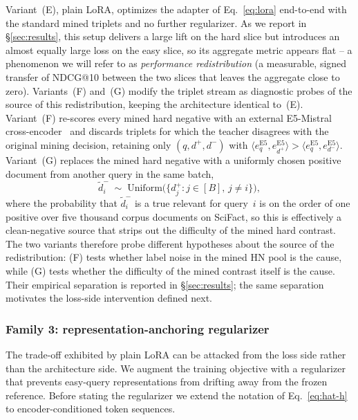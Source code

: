 Variant~(E), plain LoRA, optimizes the adapter of Eq.~\eqref{eq:lora} end-to-end with the standard mined triplets and no further regularizer. As we report in \S\ref{sec:results}, this setup delivers a large lift on the hard slice but introduces an almost equally large loss on the easy slice, so its aggregate metric appears flat -- a phenomenon we will refer to as \emph{performance redistribution} (a measurable, signed transfer of NDCG@10 between the two slices that leaves the aggregate close to zero). Variants~(F) and~(G) modify the triplet stream as diagnostic probes of the source of this redistribution, keeping the architecture identical to~(E).
Variant~(F) re-scores every mined hard negative with an external E5-Mistral cross-encoder~\cite{wang2024e5mistral} and discards triplets for which the teacher disagrees with the original mining decision, retaining only $(q, d^+, d^-)$ with $\langle e_q^{\text{E5}}, e_{d^+}^{\text{E5}}\rangle > \langle e_q^{\text{E5}}, e_{d^-}^{\text{E5}}\rangle$.
Variant~(G) replaces the mined hard negative with a uniformly chosen positive document from another query in the same batch,
\[
\tilde d_i^- \;\sim\; \mathrm{Uniform}\bigl(\{d_j^+ : j \in [B],\, j \neq i\}\bigr),
\]
where the probability that $\tilde d_i^-$ is a true relevant for query~$i$ is on the order of one positive over five thousand corpus documents on SciFact, so this is effectively a clean-negative source that strips out the difficulty of the mined hard contrast.
The two variants therefore probe different hypotheses about the source of the redistribution: (F) tests whether label noise in the mined HN pool is the cause, while (G) tests whether the difficulty of the mined contrast itself is the cause. Their empirical separation is reported in \S\ref{sec:results}; the same separation motivates the loss-side intervention defined next.

\subsubsection*{Family 3: representation-anchoring regularizer}
The trade-off exhibited by plain LoRA can be attacked from the loss side rather than the architecture side. We augment the training objective with a regularizer that prevents easy-query representations from drifting away from the frozen reference. Before stating the regularizer we extend the notation of Eq.~\eqref{eq:hat-h} to encoder-conditioned token sequences.

